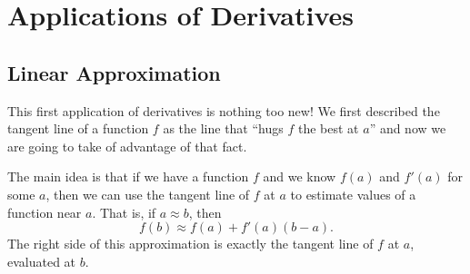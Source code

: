 
\section{Applications of Derivatives}
\label{sec:applications-of-derivatives}


\subsection{Linear Approximation}

This first application of derivatives is nothing too new! We first described the tangent line of a function $f$ as the line that ``hugs $f$ the best at $a$'' and now we are going to take of advantage of that fact.

The main idea is that if we have a function $f$ and we know $f(a)$ and $f'(a)$ for some $a$, then we can use the tangent line of $f$ at $a$ to estimate values of a function near $a$. That is, if $a\approx b$, then
$$f(b)\approx f(a)+f'(a)(b-a).$$
The right side of this approximation is exactly the tangent line of $f$ at $a$, evaluated at $b$.


